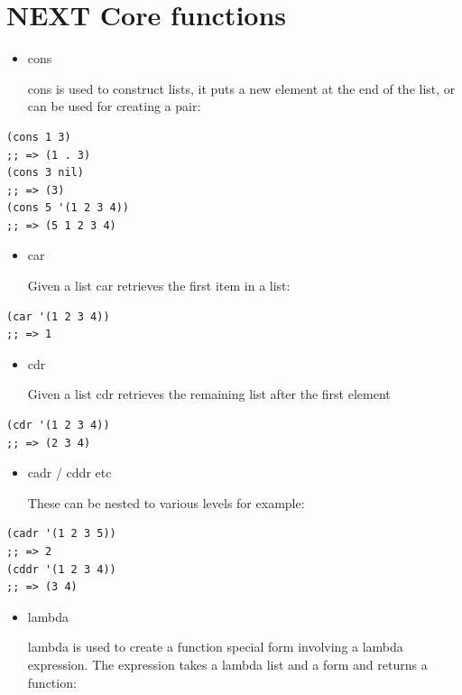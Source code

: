 \documentclass[11pt]{article}
\begin{document}
\section{{\bfseries\sffamily NEXT} Core functions}
\label{sec-4}
\begin{itemize}
\item cons

cons is used to construct lists, it puts a new element at the end
of the list, or can be used for creating a pair:
\end{itemize}

\begin{verbatim}
(cons 1 3)
;; => (1 . 3)
(cons 3 nil)
;; => (3)
(cons 5 '(1 2 3 4))
;; => (5 1 2 3 4)
\end{verbatim}

\begin{itemize}
\item car

Given a list car retrieves the first item in a list:
\end{itemize}

\begin{verbatim}
(car '(1 2 3 4))
;; => 1
\end{verbatim}

\begin{itemize}
\item cdr

Given a list cdr retrieves the remaining list after the first
element
\end{itemize}

\begin{verbatim}
(cdr '(1 2 3 4))
;; => (2 3 4)
\end{verbatim}

\begin{itemize}
\item cadr / cddr etc

These can be nested to various levels for example:
\end{itemize}

\begin{verbatim}
(cadr '(1 2 3 5))
;; => 2
(cddr '(1 2 3 4))
;; => (3 4)
\end{verbatim}

\begin{itemize}
\item lambda

lambda is used to create a function special form involving a
lambda expression. The expression takes a lambda list and a form
and returns a function:
\end{itemize}
\end{document}
